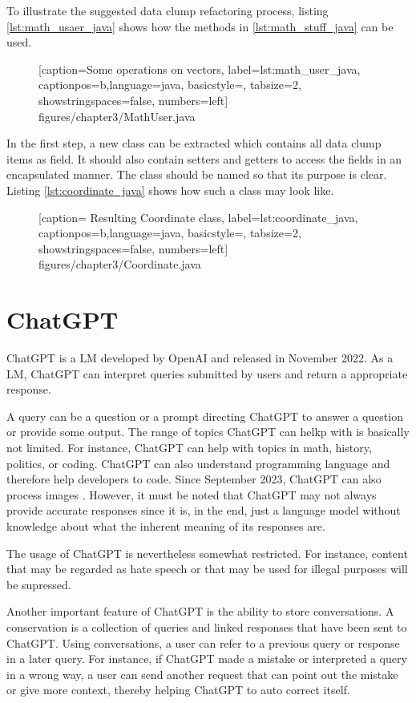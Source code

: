To illustrate the suggested data clump refactoring process, listing \ref{lst:math_usaer_java} shows how the methods in \ref{lst:math_stuff_java} can be used. 


  \begin{figure} [htbp!]
			
			[caption={Some operations on vectors},
			label={lst:math_user_java},
			captionpos=b,language=java, basicstyle=\footnotesize, tabsize=2, showstringspaces=false,  numbers=left]
			{figures/chapter3/MathUser.java}
	\end{figure}

In the first step, a new class can be extracted which contains all data clump items as field. It should also contain setters and getters to access the fields in an encapsulated manner. The class should be named so that its purpose is clear. Listing \ref{lst:coordinate_java} shows how such a class may look like. 

  \begin{figure} [htbp!]
			
			[caption={ Resulting Coordinate class},
			label={lst:coordinate_java},
			captionpos=b,language=java, basicstyle=\footnotesize, tabsize=2, showstringspaces=false,  numbers=left]
			{figures/chapter3/Coordinate.java}
		\end{figure}




\section{ChatGPT}

ChatGPT \cite{ChatGPT_url} is a \ac{LM} developed by OpenAI and released in November 2022. As a \ac{LM}, ChatGPT can interpret queries submitted by users and return a appropriate response. 

A query can be a question or a prompt directing ChatGPT to answer a question or provide some output. The range of topics ChatGPT can helkp with is basically not limited. For instance, ChatGPT can help with topics in math, history, politics, or coding. ChatGPT can also understand programming language and therefore help developers to code.  Since September 2023, ChatGPT can also process images \cite{ChatGPT_image}. However, it must be noted that ChatGPT may not always provide accurate responses since it is, in the end, just a language model without knowledge about what the inherent meaning of its responses are. 

The usage of ChatGPT is nevertheless somewhat restricted. For instance, content that may be regarded as hate speech or that may be used for illegal purposes will be supressed.

Another important feature of ChatGPT is the ability to store conversations. A conservation is a collection of queries and linked responses that have been sent to ChatGPT. Using conversations, a user can refer to a previous query or response in a later query. For instance, if ChatGPT made a mistake or interpreted a query in a wrong way, a user can send another request that can point out the mistake or give more context, thereby helping ChatGPT to auto correct itself. 
